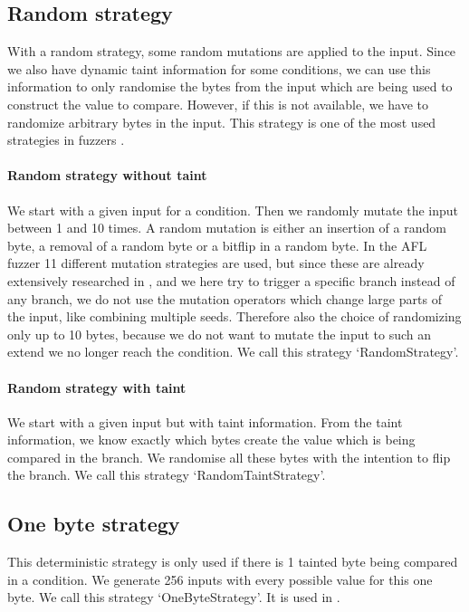\subsection{Random strategy}
With a random strategy, some random mutations are applied to the input. Since we also have dynamic taint information for some conditions, we can use this information to only randomise the bytes from the input which are being used to construct the value to compare. However, if this is not available, we have to randomize arbitrary bytes in the input. This strategy is one of the most used strategies in fuzzers \cite{aflfuzzer, fioraldi2020afl++, rawat2017vuzzer, chen2018angora}.
\paragraph{Random strategy without taint}
We start with a given input for a condition. Then we randomly mutate the input between 1 and 10 times. A random mutation is either an insertion of a random byte, a removal of a random byte or a bitflip in a random byte.
In the AFL fuzzer\cite{aflfuzzer} 11 different mutation strategies are used, but since these are already extensively researched in \cite{lyu2019mopt}, and we here try to trigger a specific branch instead of any branch, we do not use the mutation operators which change large parts of the input, like combining multiple seeds. Therefore also the choice of randomizing only up to 10 bytes, because we do not want to mutate the input to such an extend we no longer reach the condition.
We call this strategy `RandomStrategy'.
\paragraph{Random strategy with taint}
We start with a given input but with taint information. From the taint information, we know exactly which bytes create the value which is being compared in the branch. We randomise all these bytes with the intention to flip the branch.
We call this strategy `RandomTaintStrategy'.

\subsection{One byte strategy}
This deterministic strategy is only used if there is 1 tainted byte being compared in a condition. We generate 256 inputs with every possible value for this one byte. We call this strategy `OneByteStrategy'. It is used in \cite{chen2018angora}.

